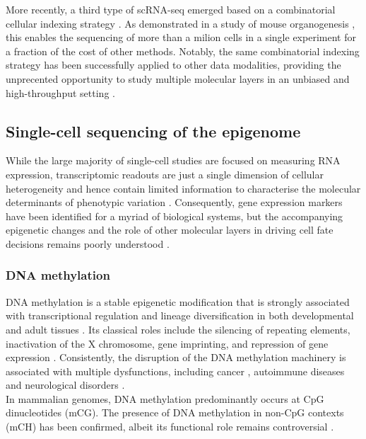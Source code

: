 More recently, a third type of scRNA-seq emerged based on a combinatorial cellular indexing strategy \cite{Cao2017,Rosenberg2018}. As demonstrated in a study of mouse organogenesis \cite{Cao2019}, this enables the sequencing of more than a milion cells in a single experiment for a fraction of the cost of other methods. Notably, the same combinatorial indexing strategy has been successfully applied to other data modalities, providing the unprecented opportunity to study multiple molecular layers in an unbiased and high-throughput setting \cite{Vitak2017, Ramani2017, Mulqueen2018}.

\subsection{Single-cell sequencing of the epigenome}

While the large majority of single-cell studies are focused on measuring RNA expression, transcriptomic readouts are just a single dimension of cellular heterogeneity and hence contain limited information to characterise the molecular determinants of phenotypic variation \cite{Ritchie2015}. Consequently, gene expression markers have been identified for a myriad of biological systems, but the accompanying epigenetic changes and the role of other molecular layers in driving cell fate decisions remains poorly understood \cite{Griffiths2018,Kelsey2017,Bheda2014}.

\subsubsection{DNA methylation} \label{section:dna_methylation}
DNA methylation is a stable epigenetic modification that is strongly associated with transcriptional regulation and lineage diversification in both developmental and adult tissues \cite{Jin2018, Harrison2011, Lee2014, Smith2013}. Its classical roles include the silencing of repeating elements, inactivation of the X chromosome, gene imprinting, and repression of gene expression \cite{Jones2012}. Consistently, the disruption of the DNA methylation machinery is associated with multiple dysfunctions, including cancer \cite{Baylin2011}, autoimmune diseases \cite{Liu2013} and neurological disorders \cite{Amir1999}.\\
In mammalian genomes, DNA methylation predominantly occurs at CpG dinucleotides (mCG). The presence of DNA methylation in non-CpG contexts (mCH) has been confirmed, albeit its functional role remains controversial \cite{He2015, Ramsahoye2000, Lister2009}.\\

